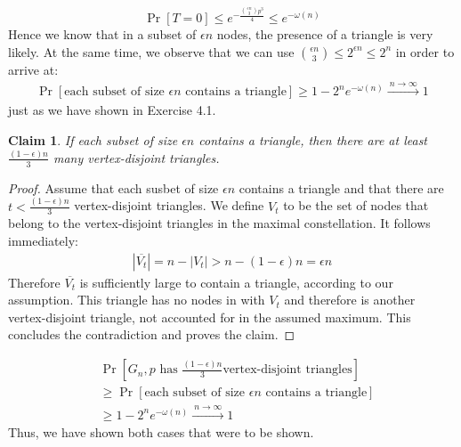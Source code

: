 \documentclass[a4paper,german]{article}
\newtheorem{claim}{Claim}
\begin{document}
\[ \Pr [T = 0] \leq e^{-\frac{{\epsilon n \choose 3}p^3}{4}} \leq e ^{-\omega(n)}\]
Hence we know that in a subset of \(\epsilon n \) nodes, the presence of a triangle is very likely. At the same time, we observe that we can use \( {\epsilon n \choose 3} \leq 2^{\epsilon n} \leq 2^n \) in order to arrive at:
\begin{align*}
\Pr[\text{each subset of size } \epsilon n \text{ contains a triangle} ] \geq 1 - 2^n e^{- \omega(n)} \xrightarrow{\: n \to \infty \: }  1
\end{align*} 
just as we have shown in Exercise 4.1.

\begin{claim} If each subset of size \(\epsilon n\) contains a triangle, then there are at least \(\frac{(1 - \epsilon)n}{3}\) many vertex-disjoint triangles. 
\end{claim}
\begin{proof}
Assume that each susbet of size \(\epsilon n\) contains a triangle and that there are \(t < \frac{(1 - \epsilon)n}{3}\) vertex-disjoint triangles. We define \(V_t\) to be the set of nodes that belong to the vertex-disjoint triangles in the maximal constellation. It follows immediately:
\begin{align*}
|\overline{V_t}|= n - |{V_t}| > n - (1 - \epsilon) n = \epsilon n
\end{align*}
Therefore \(\overline{V_t}\) is sufficiently large to contain a triangle, according to our assumption. This triangle has no nodes in with \(V_t\) and therefore is another vertex-disjoint triangle, not accounted for in the assumed maximum. This concludes the contradiction and proves the claim.
\end{proof}

\begin{align*}
&\Pr[G_n,p \text{ has } \frac{(1 - \epsilon)n}{3} \text {vertex-disjoint triangles}]  \\
& \geq \Pr[\text{each subset of size } \epsilon n \text{ contains a triangle}] \\
& \geq 1 - 2^n e^{- \omega(n)} \xrightarrow{\: n \to \infty \: }  1
\end{align*}
Thus, we have shown both cases that were to be shown.
\end{document}
